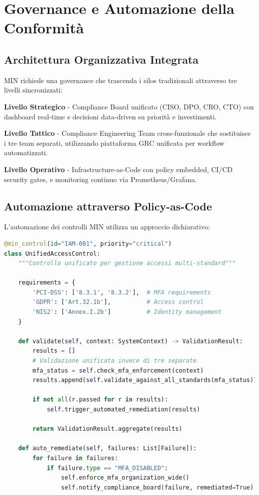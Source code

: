 \section{\texorpdfstring{Governance e Automazione della Conformità}{4.5 - Governance e Automazione}}
\label{sec:governance}

\subsection{\texorpdfstring{Architettura Organizzativa Integrata}{4.5.1 - Architettura Organizzativa}}

MIN richiede una governance che trascenda i silos tradizionali attraverso tre livelli sincronizzati:

\textbf{Livello Strategico} - Compliance Board unificato (CISO, DPO, CRO, CTO) con dashboard real-time e decisioni data-driven su priorità e investimenti.

\textbf{Livello Tattico} - Compliance Engineering Team cross-funzionale che sostituisce i tre team separati, utilizzando piattaforma GRC unificata per workflow automatizzati.

\textbf{Livello Operativo} - Infrastructure-as-Code con policy embedded, CI/CD security gates, e monitoring continuo via Prometheus/Grafana.

\subsection{\texorpdfstring{Automazione attraverso Policy-as-Code}{4.5.2 - Policy-as-Code}}

L'automazione dei controlli MIN utilizza un approccio dichiarativo:

\begin{lstlisting}[language=Python, caption={Controllo MIN unificato in Policy-as-Code}, label={lst:min_control}]
@min_control(id="IAM-001", priority="critical")
class UnifiedAccessControl:
    """Controllo unificato per gestione accessi multi-standard"""
    
    requirements = {
        'PCI-DSS': ['8.3.1', '8.3.2'],  # MFA requirements
        'GDPR': ['Art.32.1b'],          # Access control
        'NIS2': ['Annex.I.2b']          # Identity management
    }
    
    def validate(self, context: SystemContext) -> ValidationResult:
        results = []
        # Validazione unificata invece di tre separate
        mfa_status = self.check_mfa_enforcement(context)
        results.append(self.validate_against_all_standards(mfa_status))
        
        if not all(r.passed for r in results):
            self.trigger_automated_remediation(results)
        
        return ValidationResult.aggregate(results)
    
    def auto_remediate(self, failures: List[Failure]):
        for failure in failures:
            if failure.type == "MFA_DISABLED":
                self.enforce_mfa_organization_wide()
                self.notify_compliance_board(failure, remediated=True)
\end{lstlisting}

